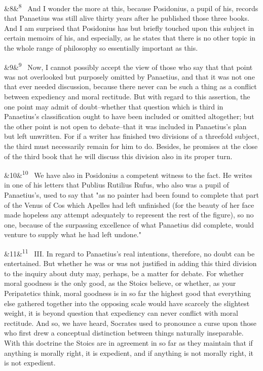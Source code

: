 \documentclass[12pt]{article}
\newcommand{\para}[1][]{\par\noindent\ifx&#1&\else\textsuperscript{\footnotesize #1}~\fi}
\begin{document}
\para[8] And I wonder the more at this, because Posidonius, a pupil of his, records that Panaetius was still alive thirty years after he published those three books. And I am surprised that Posidonius has but briefly touched upon this subject in certain memoirs of his, and especially, as he states that there is no other topic in the whole range of philosophy so essentially important as this.

\para[9] Now, I cannot possibly accept the view of those who say that that point was not overlooked but purposely omitted by Panaetius, and that it was not one that ever needed discussion, because there never can be such a thing as a conflict between expediency and moral rectitude. But with regard to this assertion, the one point may admit of doubt--whether that question which is third in Panaetius's classification ought to have been included or omitted altogether; but the other point is not open to debate--that it was included in Panaetius's plan but left unwritten. For if a writer has finished two divisions of a threefold subject, the third must necessarily remain for him to do. Besides, he promises at the close of the third book that he will discuss this division also in its proper turn.

\para[10] We have also in Posidonius a competent witness to the fact. He writes in one of his letters that Publius Rutilius Rufus, who also was a pupil of Panaetius's, used to say that "as no painter had been found to complete that part of the Venus of Cos which Apelles had left unfinished (for the beauty of her face made hopeless any attempt adequately to represent the rest of the figure), so no one, because of the surpassing excellence of what Panaetius did complete, would venture to supply what he had left undone."

\para[11] III. In regard to Panaetius's real intentions, therefore, no doubt can be entertained. But whether he was or was not justified in adding this third division to the inquiry about duty may, perhaps, be a matter for debate. For whether moral goodness is the only good, as the Stoics believe, or whether, as your Peripatetics think, moral goodness is in so far the highest good that everything else gathered together into the opposing scale would have scarcely the slightest weight, it is beyond question that expediency can never conflict with moral rectitude. And so, we have heard, Socrates used to pronounce a curse upon those who first drew a conceptual distinction between things naturally inseparable. With this doctrine the Stoics are in agreement in so far as they maintain that if anything is morally right, it is expedient, and if anything is not morally right, it is not expedient.
\end{document}
